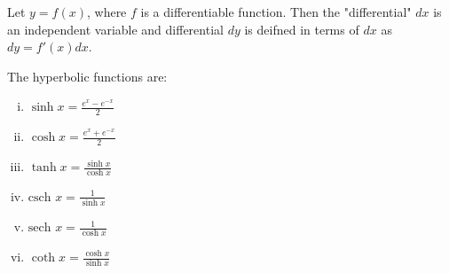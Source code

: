 \documentclass[a4paper,8pt]{article}
\begin{document}
\begin{outline}
    Let \(y = f(x)\), where \(f\) is a differentiable function. Then the "differential" \(dx\) is an independent
    variable and differential \(dy\) is deifned in terms of \(dx\) as \(dy = f'(x)dx\).

    The hyperbolic functions are:
    \begin{enumerate}[i.]
      \item \(\sinh{x} = \frac{e^x - e^{-x}}{2}\)
      \item \(\cosh{x} = \frac{e^x+e^{-x}}{2}\)
      \item \(\tanh{x} = \frac{\sinh{x}}{\cosh{x}}\)
      \item \(\text{csch }x = \frac{1}{\sinh{x}}\)
      \item \(\text{sech }x = \frac{1}{\cosh{x}}\)
      \item \(\coth{x} = \frac{\cosh{x}}{\sinh{x}}\)
    \end{enumerate}

\end{outline}
\end{document}

